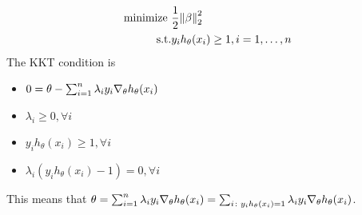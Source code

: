 \begin{eg}
    \begin{align*}
        \text{minimize } & \frac{1}{2} \norm{\beta}_2^2 \\ 
        \text{s.t.}     &y_i h_\theta (x_i) \geq 1, i = 1, \ldots, n 
    \end{align*}
    The KKT condition is 
    \begin{itemize}
        \item \(0 = \theta - \sum_{i=1}^n \lambda_i y_i \nabla_\theta h_\theta (x_i)\) 
        \item \(\lambda_i \geq 0, \forall i\) 
        \item \(y_i h_\theta (x_i) \geq 1, \forall i\)
        \item \(\lambda_i \left(y_i h_\theta (x_i) - 1\right) = 0, \forall i\)
    \end{itemize}
    This means that \(\theta = \sum_{i=1}^n \lambda_i y_i \nabla_\theta h_\theta (x_i) = \sum_{i \colon y_i h_\theta(x_i)=1} \lambda_i y_i \nabla_\theta h_\theta (x_i)\). 
\end{eg}